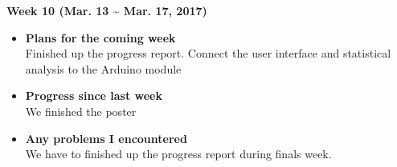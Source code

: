	\begin{center}
		\textbf{Week 10 (Mar. 13 {\textasciitilde{}} Mar. 17, 2017)}
	\end{center}
	\begin{itemize}
		\item \textbf{Plans for the coming week}
		\\Finished up the progress report. Connect the user interface and statistical analysis to the Arduino module \\

		\item \textbf{Progress since last week}
		\\We finished the poster \\

		\item \textbf{Any problems I encountered}
		\\We have to finished up the progress report during finals week.\\
	\end{itemize}











